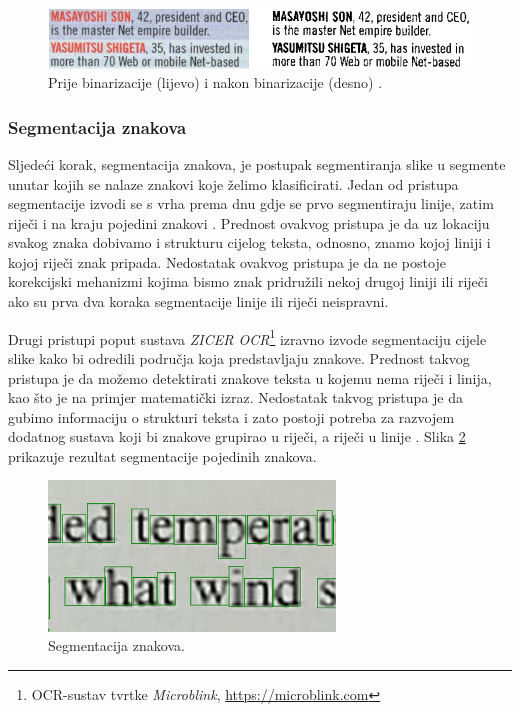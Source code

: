 \documentclass[times, utf8, zavrsni]{fer}
\begin{document}
\

\begin{figure}[htb]
    \centering
    \includegraphics[width=\textwidth]{images/binarization.png}
    \caption{
        Prije binarizacije (lijevo) i nakon binarizacije (desno)
        \citep{Vynckier:2018:HowOcrWorks}.
    }
    \label{fig:binarization}
\end{figure}


\subsubsection{Segmentacija znakova}
\label{subsubsec:segmentacija}
Sljedeći korak, segmentacija znakova, je postupak segmentiranja slike u
segmente unutar kojih se nalaze znakovi koje želimo klasificirati. Jedan od
pristupa segmentacije izvodi se s vrha prema dnu gdje se prvo segmentiraju
linije, zatim riječi i na kraju pojedini znakovi
\citep{Jurin:2017:Master,Vynckier:2018:HowOcrWorks}. Prednost ovakvog pristupa
je da uz lokaciju svakog znaka dobivamo i strukturu cijelog teksta, odnosno,
znamo kojoj liniji i kojoj riječi znak pripada. Nedostatak ovakvog pristupa je
da ne postoje korekcijski mehanizmi kojima bismo znak pridružili nekoj drugoj
liniji ili riječi ako su prva dva koraka segmentacije linije ili riječi
neispravni. \citep{Jurin:2017:Master}

Drugi pristupi poput sustava \emph{ZICER OCR}\footnote{OCR-sustav tvrtke
\emph{Microblink}, \url{https://microblink.com}} izravno
izvode segmentaciju cijele slike kako bi odredili područja koja
predstavljaju znakove. Prednost takvog pristupa je da možemo detektirati
znakove teksta u kojemu nema riječi i linija, kao što je na primjer matematički
izraz. Nedostatak takvog pristupa je da gubimo informaciju o strukturi teksta i
zato postoji potreba za razvojem dodatnog sustava koji bi znakove grupirao u
riječi, a riječi u linije \citep{Jurin:2017:Master}. Slika
\ref{fig:segmentation} prikazuje rezultat segmentacije pojedinih znakova.

\begin{figure}[htb]
    \centering
    \includegraphics[height=4cm]{images/segmentation.png}
    \caption{Segmentacija znakova.}
    \label{fig:segmentation}
\end{figure}
\end{document}
